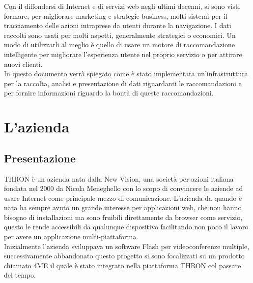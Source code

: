 \documentclass[a4paper, 12pt, twoside, openright]{book}
\newenvironment{abstract}{\cleardoublepage \null \vfill \begin{center}\bfseries\abstractname \end{center}}{\vfill\null}
\begin{document}
\begingroup %
  \makeatletter
  \let\ps@plain\ps@empty
  \makeatother
  \tableofcontents
  \listoffigures
  \clearpage
\endgroup

\begin{abstract} %
 \markboth{}{} %
 \thispagestyle{empty}
 Con il diffondersi di Internet e di servizi web negli ultimi decenni, si sono visti formare, per migliorare marketing e strategie business, molti sistemi per il tracciamento delle azioni intraprese da utenti durante la navigazione. I dati raccolti sono usati per molti aspetti, generalmente strategici o economici. Un modo di utilizzarli al meglio è quello di usare un motore di raccomandazione intelligente per migliorare l'esperienza utente nel proprio servizio o per attirare nuovi clienti.\\
 In questo documento verrà spiegato come è stato implementata un'infrastruttura per la raccolta, analisi e presentazione di dati riguardanti le raccomandazioni e per fornire informazioni riguardo la bontà di queste raccomandazioni. 
\end{abstract}

\mainmatter

\cfoot{}
	\hypersetup{linkcolor = blue}

\chapter{L'azienda} %

\section{Presentazione}
THRON è un azienda nata dalla New Vision, una società per azioni italiana fondata nel 2000 da Nicola Meneghello con lo scopo di convincere le aziende ad usare Internet come principale mezzo di comunicazione. L'azienda da quando è nata ha sempre avuto un grande interesse per applicazioni web, che non hanno bisogno di installazioni ma sono fruibili direttamente da browser come servizio, questo le rende accessibili da qualunque dispositivo facilitando non poco il lavoro per avere un applicazione multi-piattaforma.\\

Inizialmente l'azienda sviluppava un software Flash per videoconferenze multiple, successivamente abbandonato questo progetto si sono focalizzati su un prodotto chiamato 4ME il quale è stato integrato nella piattaforma THRON col passare del tempo.\\
\end{document}
